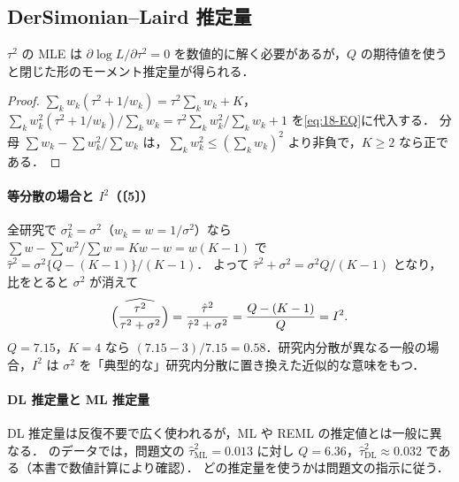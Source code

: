 \subsection{DerSimonian--Laird 推定量}\label{subsec:18-dl}
$\tau^2$ の MLE は $\partial\log L/\partial\tau^2=0$ を数値的に解く必要があるが，$Q$ の期待値を使うと閉じた形のモーメント推定量が得られる．
\begin{proof}
$\sum_kw_k(\tau^2+1/w_k)=\tau^2\sum_kw_k+K$，$\sum_kw_k^2(\tau^2+1/w_k)/\sum_kw_k=\tau^2\sum_kw_k^2/\sum_kw_k+1$ を\cref{eq:18-EQ}に代入する．
分母 $\sum w_k-\sum w_k^2/\sum w_k$ は，$\sum_kw_k^2\le(\sum_kw_k)^2$ より非負で，$K\ge2$ なら正である．
\end{proof}
\paragraph{等分散の場合と $I^2$（〔5〕）}
全研究で $\sigma_k^2=\sigma^2$（$w_k=w=1/\sigma^2$）なら $\sum w-\sum w^2/\sum w=Kw-w=w(K-1)$ で $\hat\tau^2=\sigma^2\{Q-(K-1)\}/(K-1)$．
よって $\hat\tau^2+\sigma^2=\sigma^2Q/(K-1)$ となり，比をとると $\sigma^2$ が消えて
\begin{equation}
\widehat{\Bigl(\frac{\tau^2}{\tau^2+\sigma^2}\Bigr)}=\frac{\hat\tau^2}{\hat\tau^2+\sigma^2}=\frac{Q-(K-1)}{Q}=I^2 .\label{eq:18-i2eq}
\end{equation}
$Q=7.15$，$K=4$ なら $(7.15-3)/7.15=0.58$．研究内分散が異なる一般の場合，$I^2$ は $\sigma^2$ を「典型的な」研究内分散に置き換えた近似的な意味をもつ．

\paragraph{DL 推定量と ML 推定量}
DL 推定量は反復不要で広く使われるが，ML や REML の推定値とは一般に異なる．
 のデータでは，問題文の $\hat\tau^2_{\mathrm{ML}}=0.013$ に対し $Q=6.36$，$\hat\tau^2_{\mathrm{DL}}\approx0.032$ である（本書で数値計算により確認）．
どの推定量を使うかは問題文の指示に従う．

